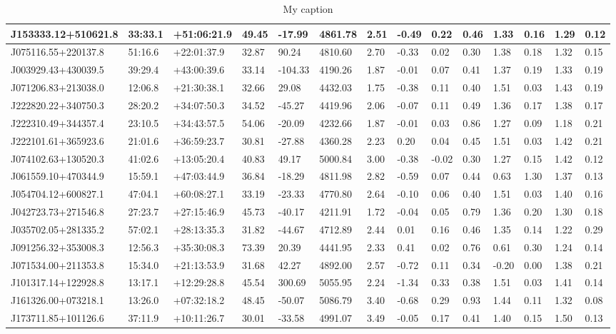 \documentclass[a4paper,fleqn,usenatbib]{mnras}
\begin{document}
\begin{table}
{\begin{tabular}{@{}llllllllllllll@{}}
			J153333.12+510621.8 & 33:33.1 & +51:06:21.9 & 49.45 & -17.99 & 4861.78 & 2.51 & -0.49 & 0.22 & 0.46 & 1.33 & 0.16 & 1.29 & 0.12 \\ \midrule
			J075116.55+220137.8 & 51:16.6 & +22:01:37.9 & 32.87 & 90.24 & 4810.60 & 2.70 & -0.33 & 0.02 & 0.30 & 1.38 & 0.18 & 1.32 & 0.15 \\ \midrule
			J003929.43+430039.5 & 39:29.4 & +43:00:39.6 & 33.14 & -104.33 & 4190.26 & 1.87 & -0.01 & 0.07 & 0.41 & 1.37 & 0.19 & 1.33 & 0.19 \\ \midrule
			J071206.83+213038.0 & 12:06.8 & +21:30:38.1 & 32.66 & 29.08 & 4432.03 & 1.75 & -0.38 & 0.11 & 0.40 & 1.51 & 0.03 & 1.43 & 0.19 \\ \midrule
			J222820.22+340750.3 & 28:20.2 & +34:07:50.3 & 34.52 & -45.27 & 4419.96 & 2.06 & -0.07 & 0.11 & 0.49 & 1.36 & 0.17 & 1.38 & 0.17 \\ \midrule
			J222310.49+344357.4 & 23:10.5 & +34:43:57.5 & 54.06 & -20.09 & 4232.66 & 1.87 & -0.01 & 0.03 & 0.86 & 1.27 & 0.09 & 1.18 & 0.21 \\ \midrule
			J222101.61+365923.6 & 21:01.6 & +36:59:23.7 & 30.81 & -27.88 & 4360.28 & 2.23 & 0.20 & 0.04 & 0.45 & 1.51 & 0.03 & 1.42 & 0.21 \\ \midrule
			J074102.63+130520.3 & 41:02.6 & +13:05:20.4 & 40.83 & 49.17 & 5000.84 & 3.00 & -0.38 & -0.02 & 0.30 & 1.27 & 0.15 & 1.42 & 0.12 \\ \midrule
			J061559.10+470344.9 & 15:59.1 & +47:03:44.9 & 36.84 & -18.29 & 4811.98 & 2.82 & -0.59 & 0.07 & 0.44 & 0.63 & 1.30 & 1.37 & 0.13 \\ \midrule
			J054704.12+600827.1 & 47:04.1 & +60:08:27.1 & 33.19 & -23.33 & 4770.80 & 2.64 & -0.10 & 0.06 & 0.40 & 1.51 & 0.03 & 1.40 & 0.16 \\ \midrule
			J042723.73+271546.8 & 27:23.7 & +27:15:46.9 & 45.73 & -40.17 & 4211.91 & 1.72 & -0.04 & 0.05 & 0.79 & 1.36 & 0.20 & 1.30 & 0.18 \\ \midrule
			J035702.05+281335.2 & 57:02.1 & +28:13:35.3 & 31.82 & -44.67 & 4712.89 & 2.44 & 0.01 & 0.16 & 0.46 & 1.35 & 0.14 & 1.22 & 0.29 \\ \midrule
			J091256.32+353008.3 & 12:56.3 & +35:30:08.3 & 73.39 & 20.39 & 4441.95 & 2.33 & 0.41 & 0.02 & 0.76 & 0.61 & 0.30 & 1.24 & 0.14 \\ \midrule
			J071534.00+211353.8 & 15:34.0 & +21:13:53.9 & 31.68 & 42.27 & 4892.00 & 2.57 & -0.72 & 0.11 & 0.34 & -0.20 & 0.00 & 1.38 & 0.21 \\ \midrule
			J101317.14+122928.8 & 13:17.1 & +12:29:28.8 & 45.54 & 300.69 & 5055.95 & 2.24 & -1.34 & 0.33 & 0.38 & 1.51 & 0.03 & 1.41 & 0.14 \\ \midrule
			J161326.00+073218.1 & 13:26.0 & +07:32:18.2 & 48.45 & -50.07 & 5086.79 & 3.40 & -0.68 & 0.29 & 0.93 & 1.44 & 0.11 & 1.32 & 0.08 \\ \midrule
			J173711.85+101126.6 & 37:11.9 & +10:11:26.7 & 30.01 & -33.58 & 4991.07 & 3.49 & -0.05 & 0.17 & 0.41 & 1.40 & 0.15 & 1.50 & 0.13 \\ \bottomrule
		\end{tabular}%
	}
	\caption{My caption}
	\label{my-label}
\end{table}

\label{lastpage}
\end{document}
